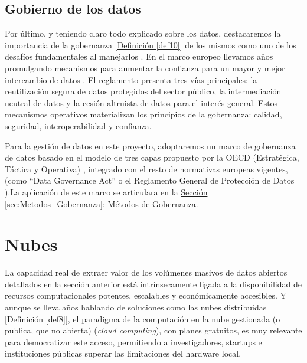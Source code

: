 	\subsection{Gobierno de los datos} \label{sec:EstudiosDatosGobernanza}
	
	Por último, y teniendo claro todo explicado sobre los datos, destacaremos la importancia de la gobernanza \hyperref[def10]{[Definición \ref*{def10}]} de los mismos como uno de los desafíos fundamentales al manejarlos \citep{DataManagement2024Theodorakopoulos}. En el marco europeo llevamos años promulgando mecanismos para aumentar la confianza para un mayor y mejor intercambio de datos \citep{EU_DGA_2022}. El reglamento presenta tres vías principales: la reutilización segura de datos protegidos del sector público, la intermediación neutral de datos y la cesión altruista de datos para el interés general. Estos mecanismos operativos materializan los principios de la gobernanza: calidad, seguridad, interoperabilidad y confianza.
	
	Para la gestión de datos en este proyecto, adoptaremos un marco de gobernanza de datos basado en el modelo de tres capas propuesto por la OECD (Estratégica, Táctica y Operativa) \citep{OECD2019}, integrado con el resto de normativas europeas vigentes, (como ``Data Governance Act'' \citep{EU_DGA_2022} o el Reglamento General de Protección de Datos \citep{webRGPD2016Europa}).La aplicación de este marco se articulara en la \hyperref[sec:Metodos_Gobernanza]{Sección \ref*{sec:Metodos_Gobernanza}: Métodos de Gobernanza}. \newpage
	
	
\section{Nubes}
\label{sec:EstudiosNubes}

La capacidad real de extraer valor de los volúmenes masivos de datos abiertos detallados en la sección anterior está intrínsecamente ligada a la disponibilidad de recursos computacionales potentes, escalables y económicamente accesibles. Y aunque se lleva años hablando de soluciones como las nubes distribuidas \hyperref[def8]{[Definición \ref*{def8}]}, el paradigma de la computación en la nube gestionada (o publica, que no abierta) (\textit{cloud computing}), con planes gratuitos, es muy relevante para democratizar este acceso, permitiendo a investigadores, startups e instituciones públicas superar las limitaciones del hardware local.


